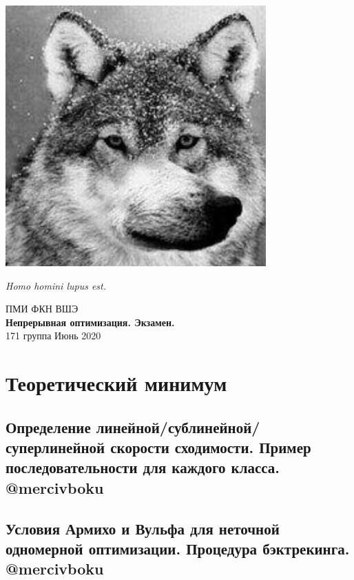 \documentclass[a4paper, 16pt]{article}
\begin{document}
    \begin{titlepage}
        \centering
        \includegraphics[width=10cm]{images/wolfe.jpg} \\
        \begin{flushright}
            \textit{\large Homo homini lupus est.}
        \end{flushright}
        \vspace{0.5cm}
        \Large{ПМИ ФКН ВШЭ} \\
        \huge{\bf Непрерывная оптимизация. Экзамен.} \\
        \vspace{0.2cm}
        \Large{171 группа}
        \vfill
        \Large{Июнь 2020}
    \end{titlepage}
    \thispagestyle{first}
    \newpage
    \setcounter{tocdepth}{2}
	\tableofcontents
	\newpage
	\pagestyle{plain}

    \section{Теоретический минимум}
    \subsection{Определение линейной/сублинейной/суперлинейной скорости сходимости. Пример последовательности для каждого класса. @mercivboku}

    

    \subsection{Условия Армихо и Вульфа для неточной одномерной оптимизации. Процедура бэктрекинга. @mercivboku}
\end{document}
